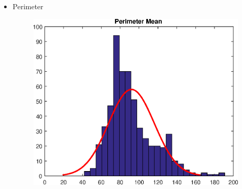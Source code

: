 \documentclass[11pt,a4paper]{article}
\numberwithin{equation}{section}
\begin{document}
\begin{itemize}
\item Perimeter
\begin{figure}[H]
\centering
  \includegraphics[width=.5\linewidth]{./img/perimeter_mean}
  \label{fig:test1}
\end{figure}%


\end{itemize}
\end{document}
